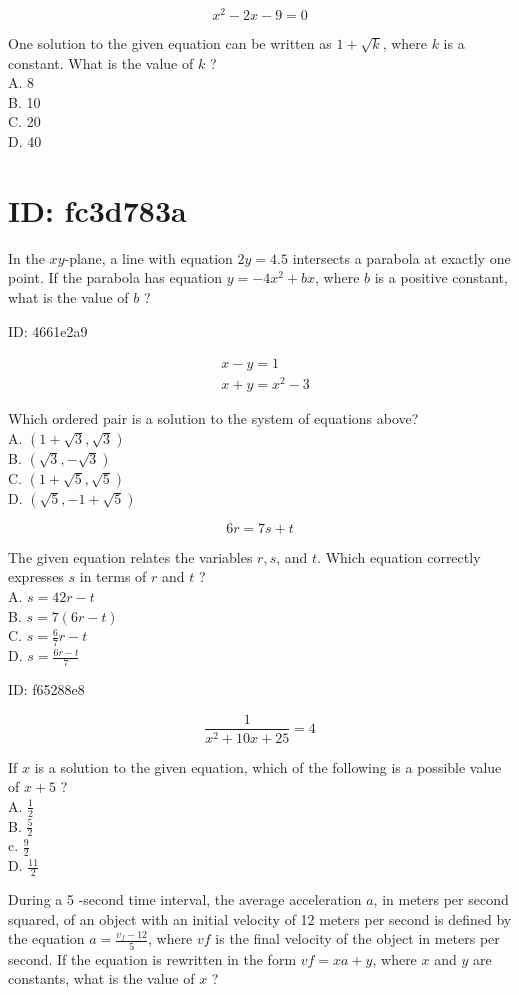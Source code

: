 $$
x^{2}-2 x-9=0
$$

One solution to the given equation can be written as $1+\sqrt{k}$, where $k$ is a constant. What is the value of $k$ ?\\
A. 8\\
B. 10\\
C. 20\\
D. 40

\section*{ID: fc3d783a}
In the $x y$-plane, a line with equation $2 y=4.5$ intersects a parabola at exactly one point. If the parabola has equation $y=-4 x^{2}+b x$, where $b$ is a positive constant, what is the value of $b$ ?

ID: 4661e2a9

$$
\begin{aligned}
& x-y=1 \\
& x+y=x^{2}-3
\end{aligned}
$$

Which ordered pair is a solution to the system of equations above?\\
A. $(1+\sqrt{3}, \sqrt{3})$\\
B. $(\sqrt{3},-\sqrt{3})$\\
C. $(1+\sqrt{5}, \sqrt{5})$\\
D. $(\sqrt{5},-1+\sqrt{5})$

$$
6 r=7 s+t
$$

The given equation relates the variables $r, s$, and $t$. Which equation correctly expresses $s$ in terms of $r$ and $t$ ?\\
A. $s=42 r-t$\\
B. $s=7(6 r-t)$\\
C. $s=\frac{6}{7} r-t$\\
D. $s=\frac{6 r-t}{7}$

ID: f65288e8

$$
\frac{1}{x^{2}+10 x+25}=4
$$

If $x$ is a solution to the given equation, which of the following is a possible value of $x+5$ ?\\
A. $\frac{1}{2}$\\
B. $\frac{5}{2}$\\
c. $\frac{9}{2}$\\
D. $\frac{11}{2}$

During a 5 -second time interval, the average acceleration $a$, in meters per second squared, of an object with an initial velocity of 12 meters per second is defined by the equation $a=\frac{v_{f}-12}{5}$, where $v f$ is the final velocity of the object in meters per second. If the equation is rewritten in the form $v f=x a+y$, where $x$ and $y$ are constants, what is the value of $x$ ?

